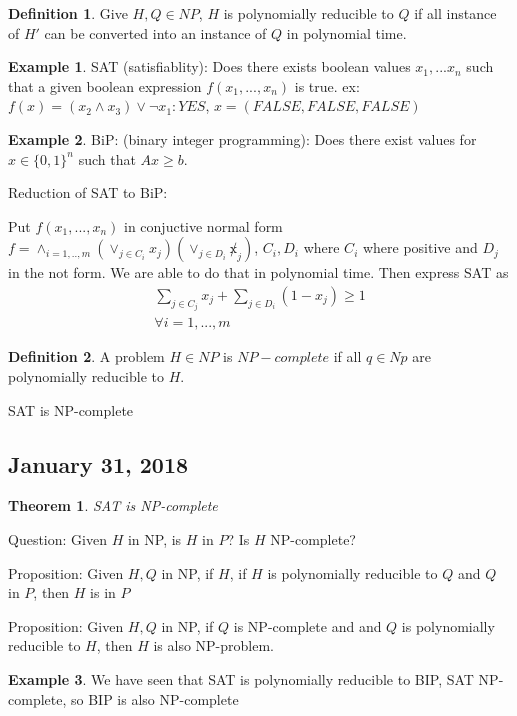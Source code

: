\documentclass{article}
\theoremstyle{plain}
\newtheorem{thm}{Theorem}
\theoremstyle{definition}
\newtheorem{eg}{Example}
\newtheorem{defn}{Definition}
\begin{document}
\begin{defn}
    Give $H,Q\in NP$, $H$ is polynomially reducible to $Q$ if all instance of $H'$
    can be converted into an instance of $Q$ in polynomial time.
\end{defn}

\begin{eg}
    SAT (satisfiablity): Does there exists boolean values $x_1, ... x_n$
    such that a given boolean expression $f(x_1, ..., x_n)$ is true.
    ex: $f(x) = (x_2\land x_3) \lor \lnot x_1: YES$, $x=(FALSE, FALSE, FALSE)$
\end{eg}

\begin{eg}
    BiP: (binary integer programming): Does there exist values for $x\in\{0,1\}^n$
    such that $Ax\geq b$.
\end{eg}

Reduction of SAT to BiP:

Put $f(x_1, ..., x_n)$ in conjuctive normal form
$f = \land_{i=1,..,m} (\lor_{j\in C_i} x_j) (\lor_{j\in D_i} \not x_j)$,
$C_i, D_i$ where $C_i$ where positive and $D_j$ in the not form.
We are able to do that in polynomial time. Then express SAT
as
\begin{align*}
    \sum_{j\in C_j} x_j + \sum_{j\in D_i}(1-x_j) \geq 1\\
    \forall i = 1,...,m
\end{align*}

\begin{defn}
    A problem $H\in NP$ is $NP-complete$ if all $q\in Np$ are polynomially
    reducible to $H$.
\end{defn}

SAT is NP-complete

\subsection{January 31, 2018}
\begin{thm}
    SAT is NP-complete
\end{thm}

Question: Given $H$ in NP, is $H$ in $P$? Is $H$ NP-complete?

Proposition: Given $H,Q$ in NP, if $H$, if $H$ is polynomially
reducible to $Q$ and $Q$ in $P$, then $H$ is in $P$

Proposition: Given $H, Q$ in NP, if $Q$ is NP-complete and and
$Q$ is polynomially reducible to $H$, then $H$ is also
NP-problem.

\begin{eg}
    We have seen that SAT is polynomially reducible to BIP,
    SAT NP-complete, so BIP is also NP-complete
\end{eg}
\end{document}
